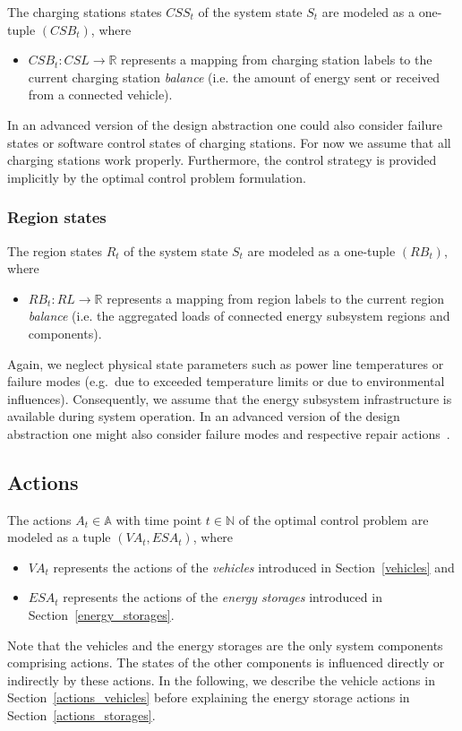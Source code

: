 The charging stations states $CSS_t$ of the system state $S_t$ are modeled as a one-tuple $(CSB_t)$, where
\begin{itemize}
	\item $CSB_t: CSL \rightarrow \mathbb{R}$ represents a mapping from charging station labels to the current charging station \textit{balance} (i.e. the amount of energy sent or received from a connected vehicle).
\end{itemize}
In an advanced version of the design abstraction one could also consider failure states or software control states of charging stations. For now we assume that all charging stations work properly. Furthermore, the control strategy is provided implicitly by the optimal control problem formulation.

\subsubsection{Region states}
\label{states_regions}

The region states $R_t$ of the system state $S_t$ are modeled as a one-tuple $(RB_t)$, where
\begin{itemize}
	\item $RB_t: RL \rightarrow \mathbb{R}$ represents a mapping from region labels to the current region \textit{balance} (i.e. the aggregated loads of connected energy subsystem regions and components).
\end{itemize}
Again, we neglect physical state parameters such as power line temperatures or failure modes (e.g.\ due to exceeded temperature limits or due to environmental influences). Consequently, we assume that the energy subsystem infrastructure is available during system operation. In an advanced version of the design abstraction one might also consider failure modes and respective repair actions~\cite{?}.

\subsection{Actions}
\label{actions}

The actions $A_t \in \mathbb{A}$ with time point $t \in \mathbb{N}$ of the optimal control problem are modeled as a tuple $(VA_t, ESA_t)$, where
\begin{itemize}
	\item $VA_t$ represents the actions of the \textit{vehicles} introduced in Section~\ref{vehicles} and
	\item $ESA_t$ represents the actions of the \textit{energy storages} introduced in Section~\ref{energy_storages}.
\end{itemize}
Note that the vehicles and the energy storages are the only system components comprising actions. The states of the other components is influenced directly or indirectly by these actions. In the following, we describe the vehicle actions in Section~\ref{actions_vehicles} before explaining the energy storage actions in Section~\ref{actions_storages}.

